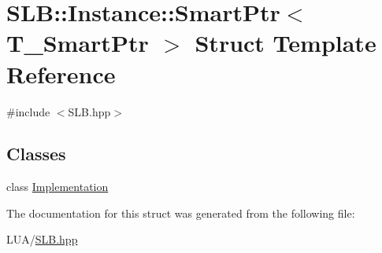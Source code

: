 \hypertarget{structSLB_1_1Instance_1_1SmartPtr}{}\section{S\+LB\+:\+:Instance\+:\+:Smart\+Ptr$<$ T\+\_\+\+Smart\+Ptr $>$ Struct Template Reference}
\label{structSLB_1_1Instance_1_1SmartPtr}


{\ttfamily \#include $<$S\+L\+B.\+hpp$>$}

\subsection*{Classes}
\begin{DoxyCompactItemize}
\item 
class \hyperlink{classSLB_1_1Instance_1_1SmartPtr_1_1Implementation}{Implementation}
\end{DoxyCompactItemize}


The documentation for this struct was generated from the following file\+:\begin{DoxyCompactItemize}
\item 
L\+U\+A/\hyperlink{SLB_8hpp}{S\+L\+B.\+hpp}\end{DoxyCompactItemize}
